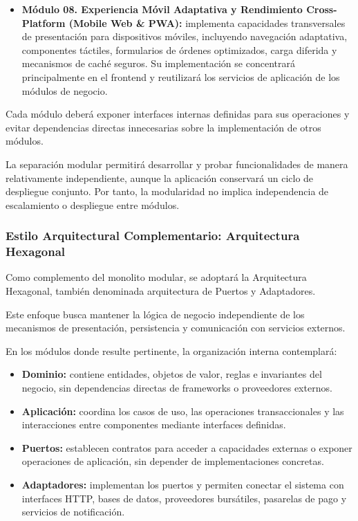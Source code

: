 \documentclass[11pt,a4paper,oneside]{article}
\begin{document}
\begin{itemize}
    \item \textbf{Módulo 08. Experiencia Móvil Adaptativa
    y Rendimiento Cross-Platform (Mobile Web \& PWA):}
    implementa capacidades transversales de
    presentación para dispositivos móviles,
    incluyendo navegación adaptativa, componentes
    táctiles, formularios de órdenes optimizados,
    carga diferida y mecanismos de caché seguros.
    Su implementación se concentrará principalmente
    en el frontend y reutilizará los servicios
    de aplicación de los módulos de negocio.

\end{itemize}

Cada módulo deberá exponer interfaces internas definidas
para sus operaciones y evitar dependencias directas
innecesarias sobre la implementación de otros módulos.

La separación modular permitirá desarrollar y probar
funcionalidades de manera relativamente independiente,
aunque la aplicación conservará un ciclo de despliegue
conjunto. Por tanto, la modularidad no implica
independencia de escalamiento o despliegue entre módulos.

\subsubsection{Estilo Arquitectural Complementario:
Arquitectura Hexagonal}

Como complemento del monolito modular, se adoptará
la Arquitectura Hexagonal, también denominada
arquitectura de Puertos y Adaptadores.

Este enfoque busca mantener la lógica de negocio
independiente de los mecanismos de presentación,
persistencia y comunicación con servicios externos.

En los módulos donde resulte pertinente,
la organización interna contemplará:

\begin{itemize}

    \item \textbf{Dominio:}
    contiene entidades, objetos de valor, reglas
    e invariantes del negocio, sin dependencias
    directas de frameworks o proveedores externos.

    \item \textbf{Aplicación:}
    coordina los casos de uso, las operaciones
    transaccionales y las interacciones entre
    componentes mediante interfaces definidas.

    \item \textbf{Puertos:}
    establecen contratos para acceder a capacidades
    externas o exponer operaciones de aplicación,
    sin depender de implementaciones concretas.

    \item \textbf{Adaptadores:}
    implementan los puertos y permiten conectar
    el sistema con interfaces HTTP, bases de datos,
    proveedores bursátiles, pasarelas de pago
    y servicios de notificación.

\end{itemize}
\end{document}
